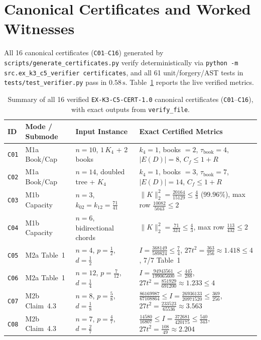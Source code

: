 \documentclass[10pt,twocolumn]{article}
\begin{document}
\section{Canonical Certificates and Worked Witnesses}
All 16 canonical certificates (\texttt{C01}--\texttt{C16}) generated by \texttt{scripts/generate\_certificates.py} verify deterministically via \texttt{python -m src.ex\_k3\_c5\_verifier certificates}, and all 61 unit/forgery/AST tests in \texttt{tests/test\_verifier.py} pass in $0.58\,\mathrm{s}$. Table~\ref{tab:certs} reports the live verified metrics.

\begin{table}[t]
\centering
\scriptsize
\setlength{\tabcolsep}{4.0pt}
\caption{Summary of all 16 verified \texttt{EX-K3-C5-CERT-1.0} canonical certificates (\texttt{C01}--\texttt{C16}), with exact outputs from \texttt{verify\_file}.}
\label{tab:certs}
\begin{tabular}{@{}llll@{}}
\toprule
ID & Mode / Submode & Input Instance & Exact Certified Metrics \\
\midrule
\texttt{C01} & M1a Book/Cap & $n=10$, $1\,K_4$ + 2 books & $k_4=1$, books $=2$, $\tau_{\mathrm{book}}=4$, $|E(D)|=8$, $C_f \le 1+R$ \\
\texttt{C02} & M1a Book/Cap & $n=14$, doubled tree + $K_4$ & $k_4=1$, books $=3$, $\tau_{\mathrm{book}}=7$, $|E(D)|=14$, $C_f \le 1+R$ \\
\texttt{C03} & M1b Capacity & $n=3$, $k_{02}=k_{12}=\tfrac{71}{41}$ & $\|K\|_2^2=\tfrac{20164}{15129}\le\tfrac{4}{3}$ ($99.96\%$), max row $\tfrac{10082}{5043}\le 2$ \\
\texttt{C04} & M1b Capacity & $n=6$, bidirectional chords & $\|K\|_2^2=\tfrac{71}{324}\le\tfrac{4}{3}$, max row $\tfrac{113}{432}\le 2$ \\
\texttt{C05} & M2a Table~1 & $n=4$, $p=\tfrac{1}{2}$, $d=\tfrac{1}{2}$ & $I=\tfrac{368149}{589824}\le\tfrac{7}{4}$, $27t^2=\tfrac{363}{256}\approx 1.418\le 4$, 7/7 Table~1 \\
\texttt{C06} & M2a Table~1 & $n=12$, $p=\tfrac{7}{12}$, $d=\tfrac{1}{4}$ & $I=\tfrac{94943561}{199065600}\le\tfrac{445}{288}$, $27t^2=\tfrac{851929}{691200}\approx 1.233\le 4$ \\
\texttt{C07} & M2b Claim~4.3 & $n=8$, $p=\tfrac{5}{8}$, $d=\tfrac{1}{8}$ & $\tfrac{86169987}{67108864}\le I=\tfrac{26936133}{20971520}\le\tfrac{369}{256}$, $27t^2=\tfrac{233523}{65536}\approx 3.563$ \\
\texttt{C08} & M2b Claim~4.3 & $n=7$, $p=\tfrac{4}{7}$, $d=\tfrac{2}{7}$ & $\tfrac{14580}{16807}\le I=\tfrac{372681}{420175}\le\tfrac{540}{343}$, $27t^2=\tfrac{108}{49}\approx 2.204$ \\

\end{tabular}
\end{table}
\end{document}
